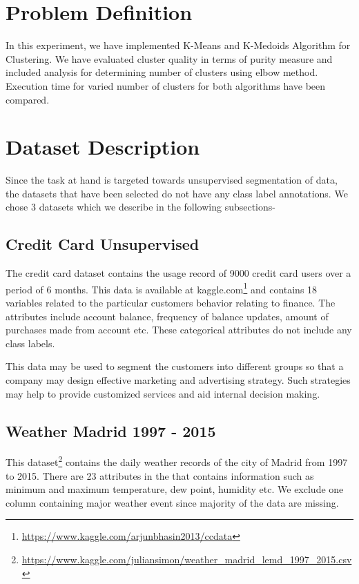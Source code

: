 \documentclass[12pt]{article}
\begin{document}
\maketitle
\thispagestyle{empty}
\clearpage
\newpage

\section{Problem Definition}
In this experiment, we have implemented K-Means and K-Medoids Algorithm for Clustering. We have evaluated cluster quality in terms of purity measure and included analysis for determining number of clusters using elbow method. Execution time for varied number of clusters for both algorithms have been compared.

\section{Dataset Description}
Since the task at hand is targeted towards unsupervised segmentation of data, the datasets that have been selected do not have any class label annotations. We chose 3 datasets which we describe in the following subsections-

\subsection{Credit Card Unsupervised}
\label{credit}
The credit card dataset contains the usage record of 9000 credit card users over a period of 6 months. This data is available at kaggle.com\footnote{\url{https://www.kaggle.com/arjunbhasin2013/ccdata}} and contains 18 variables related to the particular customers behavior relating to finance. The attributes include account balance, frequency of balance updates, amount of purchases made from account etc. These categorical attributes do not include any class labels.

This data may be used to segment the customers into different groups so that a company may design effective marketing and advertising strategy. Such strategies may help to provide customized services and aid internal decision making.

\subsection{Weather Madrid 1997 - 2015}
This dataset\footnote{\url{https://www.kaggle.com/juliansimon/weather_madrid_lemd_1997_2015.csv}} contains the daily weather records of the city of Madrid from 1997 to 2015. There are 23 attributes in the that contains information such as minimum and maximum temperature, dew point, humidity etc. We exclude one column containing major weather event since majority of the data are missing.
\end{document}
